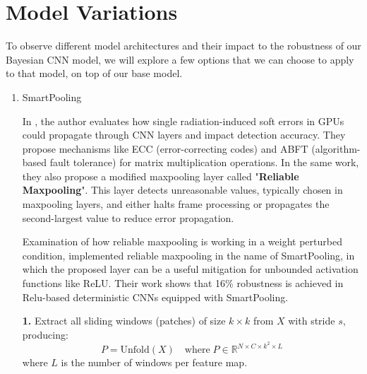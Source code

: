 \documentclass[ %
                    author={Revalda Putawara},
                supervisor={Dr. James Pope},
                    degree={MSc},
                     title={Robustness of Bayesian Neural Networks Design Choices Against Weight and Bias Perturbation Induced by Single Event Upsets (SEUs)},
                      type={},
                      year={2025}]{dissertation}
\begin{document}

\section{Model Variations} \label{subsection:modelvariations}

To observe different model architectures and their impact to the robustness of our Bayesian CNN model, we will explore a few options that we can choose to apply to that model, on top of our base model. 

\begin{enumerate}[noitemsep, topsep=0pt]
\item SmartPooling

In \cite{santos_2019a}, the author evaluates how single radiation-induced soft errors in GPUs could propagate through CNN layers and impact detection accuracy. They propose mechanisms like ECC (error-correcting codes) and ABFT (algorithm-based fault tolerance) for matrix multiplication operations. In the same work, they also propose a modified maxpooling layer called "\textbf{Reliable Maxpooling}". This layer detects unreasonable values, typically chosen in maxpooling layers, and either halts frame processing or propagates the second-largest value to reduce error propagation.

Examination of how reliable maxpooling is working in a weight perturbed condition, \cite{dennispoperobustcnn} implemented reliable maxpooling in the name of SmartPooling, in which the proposed layer can be a useful mitigation for unbounded activation functions like ReLU. Their work shows that 16\% robustness is achieved in Relu-based deterministic CNNs equipped with SmartPooling.

\begin{algorithm}[h]
\caption{SmartPool: Reliable Max-Pooling with Outlier Detection and Correction}
\BlankLine
\textbf{1.} Extract all sliding windows (patches) of size $k \times k$ from $X$ with stride $s$, producing:
\[
P = \text{Unfold}(X) \quad \text{where}\; P \in \mathbb{R}^{N \times C \times k^2 \times L}
\]
where $L$ is the number of windows per feature map.\;


\end{algorithm}
\end{enumerate}
\end{document}
